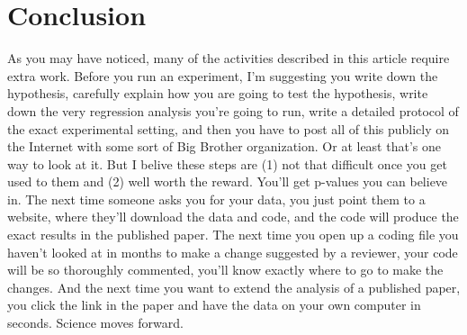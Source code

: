 \documentclass[12pt] {article}
\begin{document}
\section{Conclusion}\label{conclusion}

As you may have noticed, many of the activities described in this article
require extra work. Before you run an experiment, I'm suggesting you
write down the hypothesis, carefully explain how you are going to test
the hypothesis, write down the very regression analysis you're going to
run, write a detailed protocol of the exact experimental setting, and
then you have to post all of this publicly on the Internet with some
sort of Big Brother organization. Or at least that's one way to look at
it. But I belive these steps are (1) not that difficult once
you get used to them and (2) well worth the reward. You'll get p-values
you can believe in. The next time someone asks you for your data, you
just point them to a website, where they'll download the data and
code, and the code will produce the exact results in the published
paper. The next time you open up a coding file you haven't looked at in
months to make a change suggested by a reviewer, your code will be so
thoroughly commented, you'll know exactly where to go to make the
changes. And the next time you want to extend the analysis of a
published paper, you click the link in the paper and have the data on
your own computer in seconds. Science moves forward.


\end{document}

